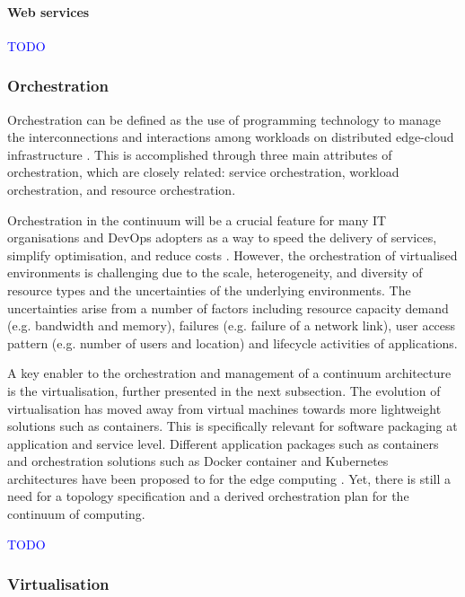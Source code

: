 \documentclass{ieeeaccess}
\begin{document}
\paragraph{Web services}

\textcolor{blue}{TODO}

\subsubsection{Orchestration}

Orchestration can be defined as the use of programming technology to manage the interconnections and interactions among workloads on distributed edge-cloud infrastructure \cite{cloud-to-thing}. This is accomplished through three main attributes of orchestration, which are closely related: service orchestration, workload orchestration, and resource orchestration. 

Orchestration in the continuum will be a crucial feature for many IT organisations and DevOps adopters as a way to speed the delivery of services, simplify optimisation, and reduce costs \cite{akamai}. However, the orchestration of virtualised environments is challenging due to the scale, heterogeneity, and diversity of resource types and the uncertainties of the underlying environments. The uncertainties arise from a number of factors including resource capacity demand (e.g. bandwidth and memory), failures (e.g. failure of a network link), user access pattern (e.g. number of users and location) and lifecycle activities of applications.

A key enabler to the orchestration and management of a continuum architecture is the virtualisation, further presented in the next subsection. The evolution of virtualisation has moved away from virtual machines towards more lightweight solutions such as containers. This is specifically relevant for software packaging at application and service level. Different application packages such as containers and orchestration solutions such as Docker container and Kubernetes architectures \cite{lxc-docker-k8s} have been proposed to for the edge computing \cite{camera-virtualisation}. Yet, there is still a need for a topology specification and a derived orchestration plan for the continuum of computing.

\textcolor{blue}{TODO}

\subsubsection{Virtualisation}
\label{sec:virtualisation}
\end{document}
